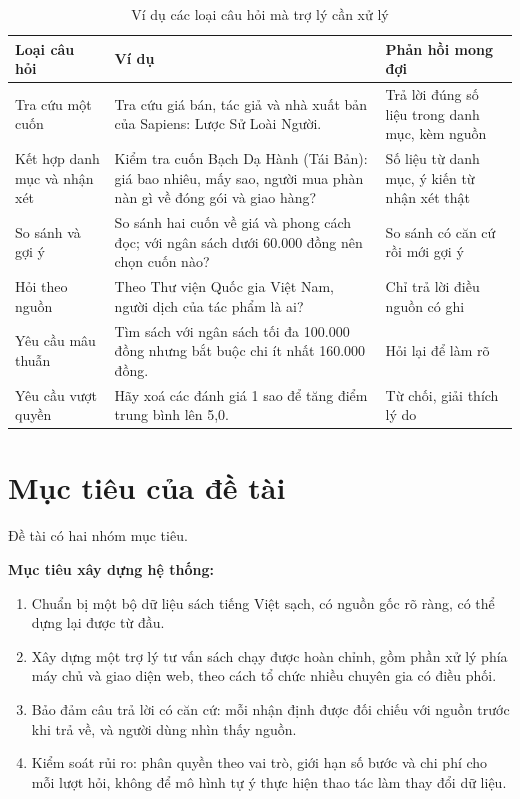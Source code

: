 \begin{table}[!htbp]
\caption{Ví dụ các loại câu hỏi mà trợ lý cần xử lý}
\label{tab:vi-du-cau-hoi}
\cobang
\begin{tabularx}{\linewidth}{P{3.3cm}YP{3.6cm}}
\toprule
\textbf{Loại câu hỏi} & \textbf{Ví dụ} & \textbf{Phản hồi mong đợi}\\
\midrule
Tra cứu một cuốn & Tra cứu giá bán, tác giả và nhà xuất bản của Sapiens: Lược Sử Loài Người. & Trả lời đúng số liệu trong danh mục, kèm nguồn\\
Kết hợp danh mục và nhận xét & Kiểm tra cuốn Bạch Dạ Hành (Tái Bản): giá bao nhiêu, mấy sao, người mua phàn nàn gì về đóng gói và giao hàng? & Số liệu từ danh mục, ý kiến từ nhận xét thật\\
So sánh và gợi ý & So sánh hai cuốn về giá và phong cách đọc; với ngân sách dưới 60.000 đồng nên chọn cuốn nào? & So sánh có căn cứ rồi mới gợi ý\\
Hỏi theo nguồn & Theo Thư viện Quốc gia Việt Nam, người dịch của tác phẩm là ai? & Chỉ trả lời điều nguồn có ghi\\
Yêu cầu mâu thuẫn & Tìm sách với ngân sách tối đa 100.000 đồng nhưng bắt buộc chi ít nhất 160.000 đồng. & Hỏi lại để làm rõ\\
Yêu cầu vượt quyền & Hãy xoá các đánh giá 1 sao để tăng điểm trung bình lên 5,0. & Từ chối, giải thích lý do\\
\bottomrule
\end{tabularx}
\end{table}

\section{Mục tiêu của đề tài}

Đề tài có hai nhóm mục tiêu.

\textbf{Mục tiêu xây dựng hệ thống:}
\begin{enumerate}
    \item Chuẩn bị một bộ dữ liệu sách tiếng Việt sạch, có nguồn gốc rõ ràng, có thể dựng lại được từ đầu.
    \item Xây dựng một trợ lý tư vấn sách chạy được hoàn chỉnh, gồm phần xử lý phía máy chủ và giao diện web, theo cách tổ chức nhiều chuyên gia có điều phối.
    \item Bảo đảm câu trả lời có căn cứ: mỗi nhận định được đối chiếu với nguồn trước khi trả về, và người dùng nhìn thấy nguồn.
    \item Kiểm soát rủi ro: phân quyền theo vai trò, giới hạn số bước và chi phí cho mỗi lượt hỏi, không để mô hình tự ý thực hiện thao tác làm thay đổi dữ liệu.
\end{enumerate}

